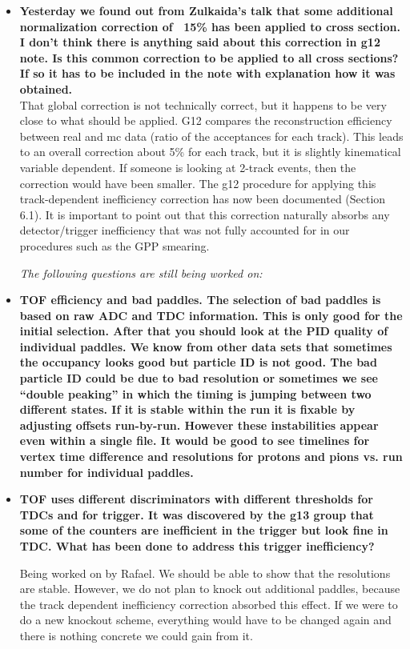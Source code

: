 \documentclass[ 12 pt]{article}
\begin{document}
\begin{itemize}
\item \textbf{Yesterday we found out from Zulkaida's talk that some additional normalization correction of ~15\% has been applied to cross section. I don't think there is anything said about this correction in g12 note. Is this common correction to be applied to all cross sections? If so it has to be included in the note with explanation how it was obtained.}\\

That global correction is not technically correct, but it happens to be very close to what should be applied. G12 compares the reconstruction efficiency between real and mc data (ratio of the acceptances for each track). This leads to an overall correction about 5\% for each track, but it is slightly kinematical variable dependent. If someone is looking at 2-track events, then the correction would have been smaller. The g12 procedure for applying this track-dependent inefficiency correction has now been documented  (Section 6.1). It is important to point out that this correction naturally absorbs any detector/trigger inefficiency that was not fully accounted for in our procedures such as the GPP smearing.



{\it The following questions are still being worked on:}


\item \textbf{TOF efficiency and bad paddles. The selection of bad paddles is based on raw 
ADC and TDC information. This is only good for the initial selection. After 
that you should look at the PID quality of individual paddles. We know from 
other data sets that sometimes the occupancy looks good but particle ID is 
not good. The bad particle ID could be due to bad resolution or sometimes we 
see “double peaking” in which the timing is jumping between two different 
states. If it is stable within the run it is fixable by adjusting offsets run-by-run. 
However these instabilities appear even within a single file. It would be good 
to see timelines for vertex time difference and resolutions for protons and 
pions vs. run number for individual paddles.}
\item \textbf{TOF uses different discriminators with different thresholds for TDCs and for
trigger. It was discovered by the g13 group that some of the counters are
inefficient in the trigger but look fine in TDC. What has been done to address
this trigger inefficiency?}

Being worked on by Rafael. We should be able to show that the resolutions are stable. However, we do not plan to knock out additional paddles, because the track dependent inefficiency correction absorbed this effect. If we were to do a new knockout scheme, everything would have to be changed again and there is nothing concrete we could gain from it.




\end{itemize}
\end{document}
